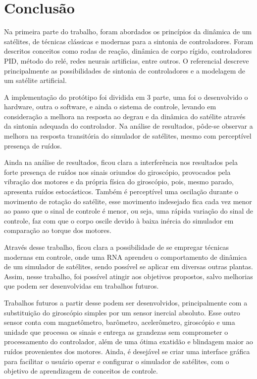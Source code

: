 \chapter[Conclusão]{Conclusão}

Na primeira parte do trabalho, foram abordados os princípios da dinâmica de um satélites, de técnicas clássicas e modernas para a sintonia de controladores. Foram descritos conceitos como rodas de reação, dinâmica de corpo rígido, controladores PID, método do relé, redes neurais artificias, entre outros. O referencial descreve principalmente as possibilidades de sintonia de controladores e a modelagem de um satélite artificial.

A implementação do protótipo foi dividida em 3 parte, uma foi o desenvolvido o hardware, outra o software, e ainda o sistema de controle, levando em consideração a melhora na resposta ao degrau e da dinâmica do satélite através da sintonia adequada do controlador. Na análise de resultados, pôde-se observar a melhora na resposta transitória do simulador de satélites, mesmo com perceptível presença de ruídos.

Ainda na análise de resultados, ficou clara a interferência nos resultados pela forte presença de ruídos nos sinais oriundos do giroscópio, provocados pela vibração dos motores e da própria física do giroscópio, pois, mesmo parado, apresenta ruídos estocásticos. Também é perceptível uma oscilação durante o movimento de rotação do satélite, esse movimento indesejado fica cada vez menor ao passo que o sinal de controle é menor, ou seja, uma rápida variação do sinal de controle, faz com que o corpo oscile devido à baixa inércia do simulador em comparação ao torque dos motores.

Através desse trabalho, ficou clara a possibilidade de se empregar técnicas modernas em controle, onde uma RNA aprendeu o comportamento de dinâmica de um simulador de satélites, sendo possível se aplicar em diversas outras plantas. Assim, nesse trabalho, foi possível atingir aos objetivos propostos, salvo melhorias que podem ser desenvolvidas em trabalhos futuros.

Trabalhos futuros a partir desse podem ser desenvolvidos, principalmente com a substituição do giroscópio simples por um sensor inercial absoluto. Esse outro sensor conta com magnetômetro, barômetro, acelerômetro, giroscópio e uma unidade que processa os sinais e entrega as grandezas sem comprometer o processamento do controlador, além de uma ótima exatidão e blindagem maior ao ruídos provenientes dos motores. Ainda, é desejável se criar uma interface gráfica para facilitar o usuário operar e configurar o simulador de satélites, com o objetivo de aprendizagem de conceitos de controle. 


